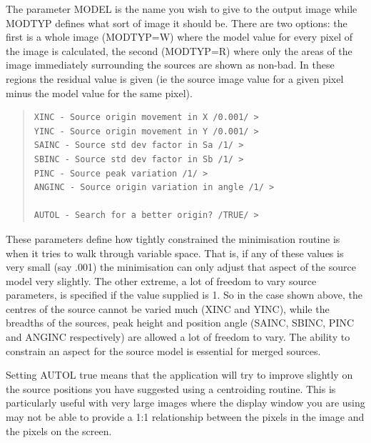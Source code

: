 \documentclass[twoside,11pt]{article}
\newenvironment{myquote}{\begin{quote}\begin{small}}{\end{small}\end{quote}}
\begin{document}
The parameter MODEL is the name you wish to give to the output image while 
MODTYP defines what sort of image it should be. There are two options: the
first is a whole image (MODTYP=W) where the model value for every pixel of the
image is calculated, the second (MODTYP=R) where only the areas of the image
immediately surrounding the sources are shown as non-bad. In these regions the 
residual value is given (ie the source image value for a given pixel
minus the model value for the same pixel).

\begin{myquote}
\begin{verbatim}
XINC - Source origin movement in X /0.001/ > 
YINC - Source origin movement in Y /0.001/ > 
SAINC - Source std dev factor in Sa /1/ > 
SBINC - Source std dev factor in Sb /1/ > 
PINC - Source peak variation /1/ > 
ANGINC - Source origin variation in angle /1/ > 

AUTOL - Search for a better origin? /TRUE/ > 
\end{verbatim}
\end{myquote}


These parameters define how tightly constrained the minimisation routine
is when it tries to walk through variable space. That is, if any of these
values is very small (say .001) the minimisation can only adjust that
aspect of the source model very slightly. The other extreme, a lot of freedom
to vary source parameters, is specified if the value supplied is 1. So in the 
case shown above, the centres of the source cannot be varied 
much (XINC and YINC), while the breadths of the sources, peak height and 
position angle (SAINC, SBINC, PINC and ANGINC respectively) are allowed
a lot of freedom to vary. The ability to constrain an aspect for the
source model is essential for merged sources. 

Setting AUTOL true means that the application will try to improve slightly 
on the source positions you have suggested using a centroiding routine.
This is particularly useful with very large images where the display
window you  
are using may not be able to provide a 1:1 relationship between the 
pixels in the image and the pixels on the screen.
\end{document}
